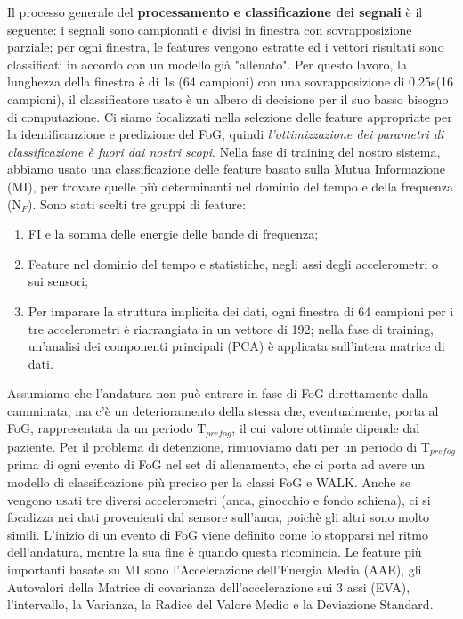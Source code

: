 \documentclass[a4paper,11pt]{article} %
\begin{document}
Il processo generale del \textbf{processamento e classificazione dei segnali} è il seguente: i segnali sono campionati e divisi in finestra con sovrapposizione parziale; per ogni finestra, le features vengono estratte ed i vettori risultati sono classificati in accordo con un modello già "allenato". Per questo lavoro, la lunghezza della finestra è di 1s (64 campioni) con una sovrapposizione di 0.25s(16 campioni), il classificatore usato è un albero di decisione per il suo basso bisogno di computazione. Ci siamo focalizzati nella selezione delle feature appropriate per la identificanzione e predizione del FoG, quindi \textit{l'ottimizzazione dei parametri di classificazione è fuori dai nostri scopi}. Nella fase di training del nostro sistema, abbiamo usato una classificazione delle feature basato sulla Mutua Informazione (MI), per trovare quelle più determinanti nel dominio del tempo e della frequenza (N$_{F}$).\linebreak
Sono stati scelti tre gruppi di feature:
\begin{enumerate}
\item FI e la somma delle energie delle bande di frequenza;
\item Feature nel dominio del tempo e statistiche, negli assi degli accelerometri o sui sensori;
\item Per imparare la struttura implicita dei dati, ogni finestra di 64 campioni per i tre accelerometri è riarrangiata in un vettore di 192; nella fase di training, un'analisi dei componenti principali (PCA) è applicata sull'intera matrice di dati.
\end{enumerate}
Assumiamo che l'andatura non può entrare in fase di FoG direttamente dalla camminata, ma c'è un deterioramento della stessa che, eventualmente, porta al FoG, rappresentata da un periodo T$_{prefog}$, il cui valore ottimale dipende dal paziente. Per il problema di detenzione, rimuoviamo dati per un periodo di T$_{prefog}$ prima di ogni evento di FoG nel set di allenamento, che ci porta ad avere un modello di classificazione più preciso per la classi FoG e WALK.\linebreak
Anche se vengono usati tre diversi accelerometri (anca, ginocchio e fondo schiena), ci si focalizza nei dati provenienti dal sensore sull'anca, poichè gli altri sono molto simili. L'inizio di un evento di FoG viene definito come lo stopparsi nel ritmo dell'andatura, mentre la sua fine è quando questa ricomincia.\linebreak
Le feature più importanti basate su MI sono l'Accelerazione dell'Energia Media (AAE), gli Autovalori della Matrice di covarianza dell'accelerazione sui 3 assi (EVA), l'intervallo, la Varianza, la Radice del Valore Medio e la Deviazione Standard.
\end{document}
